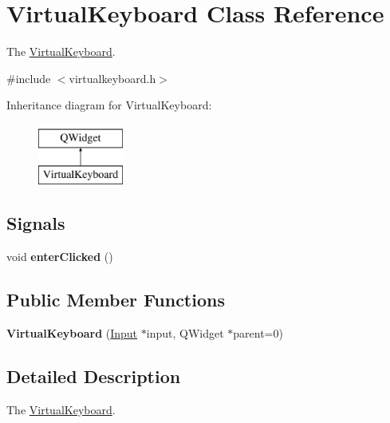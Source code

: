 \hypertarget{classVirtualKeyboard}{}\section{Virtual\+Keyboard Class Reference}
\label{classVirtualKeyboard}


The \hyperlink{classVirtualKeyboard}{Virtual\+Keyboard}.  




{\ttfamily \#include $<$virtualkeyboard.\+h$>$}

Inheritance diagram for Virtual\+Keyboard\+:\begin{figure}[H]
\begin{center}
\leavevmode
\includegraphics[height=2.000000cm]{classVirtualKeyboard}
\end{center}
\end{figure}
\subsection*{Signals}
\begin{DoxyCompactItemize}
\item 
\hypertarget{classVirtualKeyboard_a09966b8ee6ec25b337305a8203917607}{}void {\bfseries enter\+Clicked} ()\label{classVirtualKeyboard_a09966b8ee6ec25b337305a8203917607}

\end{DoxyCompactItemize}
\subsection*{Public Member Functions}
\begin{DoxyCompactItemize}
\item 
\hypertarget{classVirtualKeyboard_a1759a59c05cb6e0d48a398fa6b062c64}{}{\bfseries Virtual\+Keyboard} (\hyperlink{classInput}{Input} $\ast$input, Q\+Widget $\ast$parent=0)\label{classVirtualKeyboard_a1759a59c05cb6e0d48a398fa6b062c64}

\end{DoxyCompactItemize}


\subsection{Detailed Description}
The \hyperlink{classVirtualKeyboard}{Virtual\+Keyboard}. 

